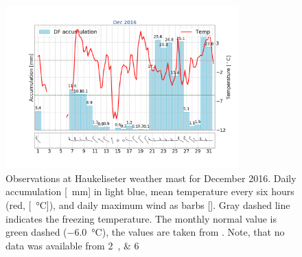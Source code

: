 \begin{figure}[t]
	\centering
    \includegraphics[trim={4.cm 3.3cm 1.5cm 3.cm},clip,
        width=0.8\textwidth]{./fig_weathermast/T_P_U_201612}
        \caption{Observations at Haukeliseter weather mast for December 2016. Daily accumulation [\SI{}{\mm}] in light blue, mean temperature every six hours (red, [\SI{}{\celsius}]), and daily maximum wind as barbs [\SI{}{\mPs}]. Gray dashed line indicates the freezing temperature. The monthly normal value is green dashed (\SI{-6.0}{\celsius}), the values are taken from \cite{eklima_norwegian_2016}. Note, that no data was available from \SIlist{2;6}{\dec}} \label{fig:DecObs}
\end{figure}